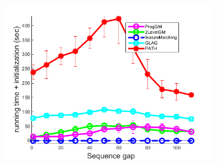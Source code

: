 \documentclass[hyperref={pdfpagelabels=false}]{beamer}
\begin{document}
\begin{frame}[allowframebreaks]
\begin{minipage}[0.2\textheight]{\textwidth}
\begin{columns}[T]
\begin{column}{0.7\textwidth}
\begin{figure}[h]
\begin{subfigure}[b]{0.32\textwidth}
					\end{subfigure}
					\begin{subfigure}[b]{0.32\textwidth}
						\centering
						\includegraphics[scale=0.12]{"fig/evaluation/HouseSeq2/anchor_descr/using_cpd_afftrafo/solution2/performance/time_summary"}
					\end{subfigure} 	
			\end{figure}
			

\end{column}
\end{columns}
\end{minipage}
\end{frame}
\end{document}
